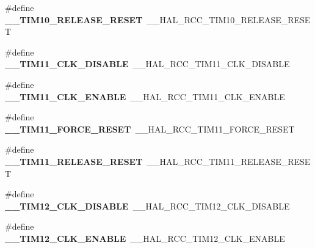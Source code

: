 \begin{DoxyCompactItemize}
\#define {\bfseries \+\_\+\+\_\+\+T\+I\+M10\+\_\+\+R\+E\+L\+E\+A\+S\+E\+\_\+\+R\+E\+S\+ET}~\+\_\+\+\_\+\+H\+A\+L\+\_\+\+R\+C\+C\+\_\+\+T\+I\+M10\+\_\+\+R\+E\+L\+E\+A\+S\+E\+\_\+\+R\+E\+S\+ET
\item 
\mbox{\label{group___h_a_l___r_c_c___aliased_ga976ce9e8e4584c22a293cac41a8c681a}} 
\#define {\bfseries \+\_\+\+\_\+\+T\+I\+M11\+\_\+\+C\+L\+K\+\_\+\+D\+I\+S\+A\+B\+LE}~\+\_\+\+\_\+\+H\+A\+L\+\_\+\+R\+C\+C\+\_\+\+T\+I\+M11\+\_\+\+C\+L\+K\+\_\+\+D\+I\+S\+A\+B\+LE
\item 
\mbox{\label{group___h_a_l___r_c_c___aliased_ga6cc8eb068efb87a58f7e4ed1c052bda6}} 
\#define {\bfseries \+\_\+\+\_\+\+T\+I\+M11\+\_\+\+C\+L\+K\+\_\+\+E\+N\+A\+B\+LE}~\+\_\+\+\_\+\+H\+A\+L\+\_\+\+R\+C\+C\+\_\+\+T\+I\+M11\+\_\+\+C\+L\+K\+\_\+\+E\+N\+A\+B\+LE
\item 
\mbox{\label{group___h_a_l___r_c_c___aliased_gabd9681b9a7bba79cd54826cce394f45a}} 
\#define {\bfseries \+\_\+\+\_\+\+T\+I\+M11\+\_\+\+F\+O\+R\+C\+E\+\_\+\+R\+E\+S\+ET}~\+\_\+\+\_\+\+H\+A\+L\+\_\+\+R\+C\+C\+\_\+\+T\+I\+M11\+\_\+\+F\+O\+R\+C\+E\+\_\+\+R\+E\+S\+ET
\item 
\mbox{\label{group___h_a_l___r_c_c___aliased_ga824e2559156eae3f0a571246d3698431}} 
\#define {\bfseries \+\_\+\+\_\+\+T\+I\+M11\+\_\+\+R\+E\+L\+E\+A\+S\+E\+\_\+\+R\+E\+S\+ET}~\+\_\+\+\_\+\+H\+A\+L\+\_\+\+R\+C\+C\+\_\+\+T\+I\+M11\+\_\+\+R\+E\+L\+E\+A\+S\+E\+\_\+\+R\+E\+S\+ET
\item 
\mbox{\label{group___h_a_l___r_c_c___aliased_gab8ee1eb9468f1037ae0b82dae47b4e36}} 
\#define {\bfseries \+\_\+\+\_\+\+T\+I\+M12\+\_\+\+C\+L\+K\+\_\+\+D\+I\+S\+A\+B\+LE}~\+\_\+\+\_\+\+H\+A\+L\+\_\+\+R\+C\+C\+\_\+\+T\+I\+M12\+\_\+\+C\+L\+K\+\_\+\+D\+I\+S\+A\+B\+LE
\item 
\mbox{\label{group___h_a_l___r_c_c___aliased_gaa238e8a1840193501450360652992b0a}} 
\#define {\bfseries \+\_\+\+\_\+\+T\+I\+M12\+\_\+\+C\+L\+K\+\_\+\+E\+N\+A\+B\+LE}~\+\_\+\+\_\+\+H\+A\+L\+\_\+\+R\+C\+C\+\_\+\+T\+I\+M12\+\_\+\+C\+L\+K\+\_\+\+E\+N\+A\+B\+LE
\item 
\mbox{\label{group___h_a_l___r_c_c___aliased_gae56b393a7c3f23192414bb515d3e0ce7}} 

\end{DoxyCompactItemize}
